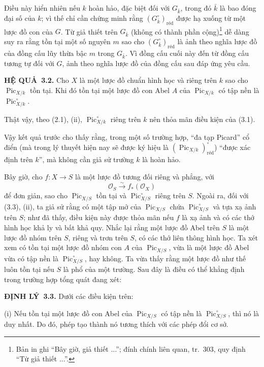 \documentclass[11pt,twoside,openany]{book}
\numberwithin{equation}{section}
\newcommand{\src}[1]{%
  \phantomsection\hypertarget{src:\fgasourceid:#1}{}%
  \marginpar{\raggedleft\footnotesize\sffamily #1}%
}
\newcommand{\fgasourceid}{unset}
\newcommand{\result}[2]{\par\medskip\noindent\textbf{#1\if\relax\detokenize{#2}\relax\else\ #2\fi.}\quad}
\begin{document}
Điều này hiển nhiên nếu $k$ hoàn hảo, đặc biệt đối với $G_{\bar k}$, trong đó
$\bar k$ là bao đóng đại số của $k$; vì thế chỉ cần chứng minh rằng
$(G_{\bar k}^\circ)_{\mathrm{réd}}$ được hạ xuống từ một lược đồ con của $G$.
Từ giả thiết trên $G_{\bar k}$ (không có thành phần cộng)\footnote{Bản in ghi
``Bây giờ, giả thiết ...''; đính chính liên quan, tr.~303, quy định ``Từ giả
thiết ...''.} dễ dàng suy ra rằng tồn tại một số nguyên $m$ sao cho
$(G_{\bar k}^\circ)_{\mathrm{réd}}$ là ảnh theo nghĩa lược đồ của đồng cấu lũy
thừa bậc $m$ trong $G_{\bar k}$. Vì đồng cấu cuối này đến từ đồng cấu tương tự
đối với $G$, ảnh theo nghĩa lược đồ của đồng cấu sau đáp ứng yêu cầu.

\result{HỆ QUẢ}{3.2} Cho $X$ là một lược đồ chuẩn hình học và riêng trên $k$ sao cho
$\operatorname{Pic}_{X/k}$ tồn tại. Khi đó tồn tại một lược đồ con Abel $A$
của $\operatorname{Pic}_{X/k}$ có tập nền là
$\operatorname{Pic}_{X/k}^\circ$.

Thật vậy, theo (2.1), (ii), $\operatorname{Pic}_{X/k}^\circ$ riêng trên $k$
nên thỏa mãn điều kiện của (3.1).
\src{237}
Vậy kết quả trước cho thấy rằng, trong một số trường hợp, ``đa tạp Picard''
cổ điển (mà trong lý thuyết hiện nay sẽ được ký hiệu là
$(\operatorname{Pic}_{X/k})_{\mathrm{réd}}^\circ$) ``được xác định trên
$k$'', mà không cần giả sử trường $k$ là hoàn hảo.

Bây giờ, cho $f:X\longrightarrow S$ là một lược đồ tương đối riêng và phẳng,
với
\[
\mathcal O_S\xrightarrow{\sim}f_*(\mathcal O_X)
\]
để đơn giản, sao cho $\operatorname{Pic}_{X/S}$ tồn tại và
$\operatorname{Pic}_{X/S}^\circ$ riêng trên $S$. Ngoài ra, đối với (3.3),
(ii), ta giả sử rằng có một tập mở của $\operatorname{Pic}_{X/S}$ chứa
$\operatorname{Pic}_{X/S}^\circ$ và tựa xạ ảnh trên $S$; như đã thấy, điều
kiện này được thỏa mãn nếu $f$ là xạ ảnh và có các thớ hình học khả ly và bất khả
quy. Nhắc lại rằng một lược đồ Abel trên $S$ là một lược đồ nhóm trên $S$,
riêng và trơn trên $S$, có các thớ liên thông hình học. Ta xét xem có tồn tại
một lược đồ nhóm con $A$ của $\operatorname{Pic}_{X/S}$, vừa là một lược đồ
Abel vừa có tập nền là $\operatorname{Pic}_{X/S}^\circ$, hay không. Ta vừa
thấy rằng một lược đồ như thế luôn tồn tại nếu $S$ là phổ của một trường. Sau
đây là điều có thể khẳng định trong trường hợp tổng quát đang xét:

\result{ĐỊNH LÝ}{3.3} Dưới các điều kiện trên:

\noindent(i) Nếu tồn tại một lược đồ con Abel của
$\operatorname{Pic}_{X/S}$ có tập nền là
$\operatorname{Pic}_{X/S}^\circ$, thì nó là duy nhất. Do đó, phép tạo thành
nó tương thích với các phép đổi cơ sở.
\end{document}

